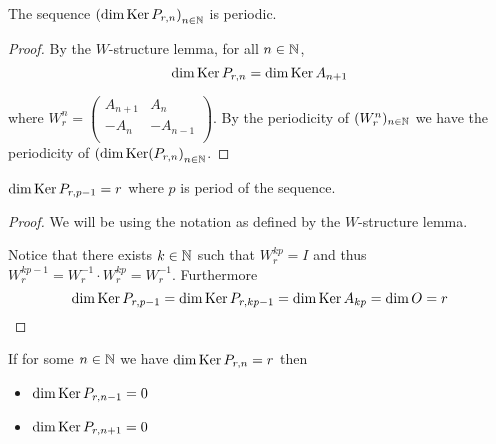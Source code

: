 \begin{proposition}
  The sequence $\left(\dim \operatorname{Ker} P_{r,n}\right)_{n\in\mathbb{N}}$
  is periodic.
\end{proposition}

\begin{proof}
  By the $W$-structure lemma, for all $n\in\mathbb{N}$,
  \[
  \dim\operatorname{Ker} P_{r,n}
  =
  \dim\operatorname{Ker} A_{n+1}
  \]

  where $W_{r}^{n}=\left(\begin{smallmatrix} A_{n+1} & A_{n}  \\ -A_{n} & -A_{n-1} \\\end{smallmatrix}\right)$.
  By the periodicity of $(W_{r}^{n})_{n\in\mathbb{N}}$ we have the
  periodicity of
  $\left(\dim\operatorname{Ker}(P_{r,n}\right)_{n\in\mathbb{N}}$.
\end{proof}

\begin{lemma}
  $\dim\operatorname{Ker} P_{r,p-1} = r$ where $p$ is period of the sequence.
\end{lemma}

\begin{proof}
  We will be using the notation as defined by the $W$-structure lemma.

  Notice that there exists $k\in\mathbb{N}$ such that $W_{r}^{kp} = I$ and
  thus $W_{r}^{kp-1} = W_{r}^{-1} \cdot W_{r}^{kp} = W_{r}^{-1}$.
  Furthermore
  \[
  \dim\operatorname{Ker} P_{r,p-1}
  =
  \dim\operatorname{Ker} P_{r,kp-1}
  =
  \dim\operatorname{Ker} A_{kp} = \dim O
  = r
  \]
\end{proof}

\begin{lemma}
  If for some $n\in\mathbb{N}$ we have $\dim\operatorname{Ker} P_{r,n} = r$ then
  \begin{itemize}
    \item $\dim\operatorname{Ker} P_{r,n-1} = 0$
    \item $\dim\operatorname{Ker} P_{r,n+1} = 0$
  \end{itemize}
\end{lemma}

